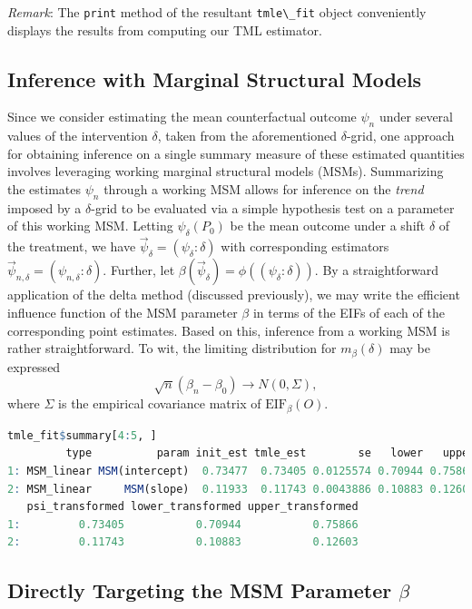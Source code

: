 \documentclass[
  12pt, krantz2,
]{book}
\newcommand{\passthrough}[1]{#1}
\theoremstyle{definition}
\theoremstyle{definition}
\theoremstyle{definition}
\newcommand{\1}{\mathbbm{1}}
\begin{document}
\emph{Remark}: The \passthrough{\lstinline!print!} method of the resultant \passthrough{\lstinline!tmle\_fit!} object conveniently
displays the results from computing our TML estimator.

\hypertarget{inference-with-marginal-structural-models}{%
\subsection{Inference with Marginal Structural Models}\label{inference-with-marginal-structural-models}}

Since we consider estimating the mean counterfactual outcome \(\psi_n\) under
several values of the intervention \(\delta\), taken from the aforementioned
\(\delta\)-grid, one approach for obtaining inference on a single summary measure
of these estimated quantities involves leveraging working marginal structural
models (MSMs). Summarizing the estimates \(\psi_n\) through a working MSM allows
for inference on the \emph{trend} imposed by a \(\delta\)-grid to be evaluated via a
simple hypothesis test on a parameter of this working MSM. Letting
\(\psi_{\delta}(P_0)\) be the mean outcome under a shift \(\delta\) of the
treatment, we have \(\vec{\psi}_{\delta} = (\psi_{\delta}: \delta)\) with
corresponding estimators \(\vec{\psi}_{n, \delta} = (\psi_{n, \delta}: \delta)\).
Further, let \(\beta(\vec{\psi}_{\delta}) = \phi((\psi_{\delta}: \delta))\). By a
straightforward application of the delta method (discussed previously), we may
write the efficient influence function of the MSM parameter \(\beta\) in terms of
the EIFs of each of the corresponding point estimates. Based on this, inference
from a working MSM is rather straightforward. To wit, the limiting distribution
for \(m_{\beta}(\delta)\) may be expressed \[\sqrt{n}(\beta_n - \beta_0) \to N(0,
\Sigma),\] where \(\Sigma\) is the empirical covariance matrix of
\(\text{EIF}_{\beta}(O)\).

\begin{lstlisting}[language=R]
tmle_fit$summary[4:5, ]
         type          param init_est tmle_est        se   lower   upper
1: MSM_linear MSM(intercept)  0.73477  0.73405 0.0125574 0.70944 0.75866
2: MSM_linear     MSM(slope)  0.11933  0.11743 0.0043886 0.10883 0.12603
   psi_transformed lower_transformed upper_transformed
1:         0.73405           0.70944           0.75866
2:         0.11743           0.10883           0.12603
\end{lstlisting}

\hypertarget{directly-targeting-the-msm-parameter-beta}{%
\subsection{\texorpdfstring{Directly Targeting the MSM Parameter \(\beta\)}{Directly Targeting the MSM Parameter \textbackslash beta}}\label{directly-targeting-the-msm-parameter-beta}}
\end{document}
